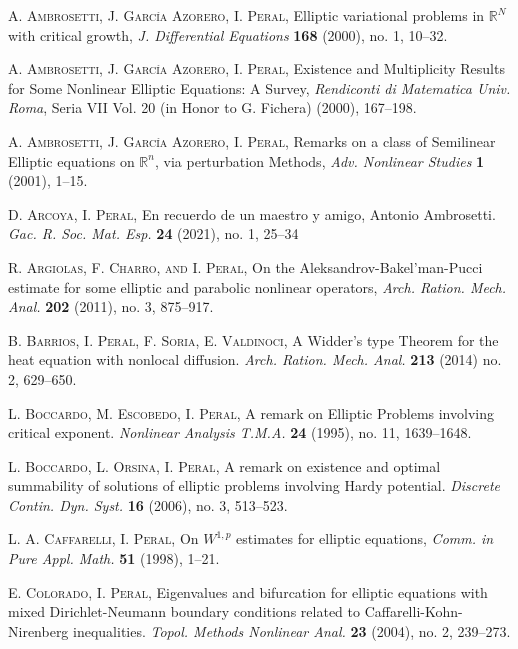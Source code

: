 \begin{thebibliography}{99}
    \textsc{A. Ambrosetti,  J. Garc\'ia Azorero, I. Peral,} Elliptic variational problems in $\mathbb{R}^N$ with critical growth, \textit{J. Differential Equations} \textbf{168}  (2000), no. 1, 10--32. 

    \textsc{A. Ambrosetti,  J. Garc\'ia Azorero, I. Peral,} Existence and Multiplicity Results for Some Nonlinear Elliptic Equations: A Survey, \textit{Rendiconti di Matematica Univ. Roma}, Seria VII Vol. 20 (in Honor to G. Fichera) (2000), 167--198.

    \textsc{A. Ambrosetti,  J. Garc\'ia Azorero, I. Peral,} Remarks on a class of Semilinear Elliptic equations on $\mathbb{R}^n$, via perturbation Methods, \textit{Adv. Nonlinear Studies} \textbf{1} (2001), 1--15.

  \textsc{D. Arcoya, I. Peral,} En recuerdo de un maestro y amigo, Antonio Ambrosetti.  \textit{Gac. R. Soc. Mat. Esp.} \textbf{24} (2021), no. 1, 25--34

    \textsc{R. Argiolas, F. Charro,   and I. Peral}, {On the Aleksandrov-Bakel'man-Pucci estimate for some elliptic and parabolic nonlinear operators}, \textit{Arch. Ration. Mech. Anal.} \textbf{202} (2011), no. 3, 875--917.

    \textsc{B. Barrios, I. Peral, F. Soria, E. Valdinoci},  A Widder's type Theorem for the heat equation with nonlocal diffusion. \textit{Arch. Ration. Mech. Anal.} \textbf{213} (2014) no. 2, 629--650. 
 
    \textsc{L. Boccardo, M. Escobedo, I. Peral},  A remark on Elliptic Problems involving critical exponent. \textit{Nonlinear Analysis T.M.A.} \textbf{24}  (1995), no. 11, 1639--1648.

     \textsc{L. Boccardo, L. Orsina, I. Peral},  A remark on existence and optimal summability of solutions of elliptic problems involving Hardy potential. \textit{Discrete Contin. Dyn. Syst.} \textbf{16} (2006), no. 3, 513--523. 

    \textsc{L. A. Caffarelli, I. Peral,} On $ W^{1,p}$ estimates for elliptic equations, \textit{Comm. in Pure Appl. Math.} \textbf{51} (1998),  1--21.

     \textsc{E. Colorado, I.  Peral, } Eigenvalues and bifurcation for elliptic equations with mixed Dirichlet-Neumann boundary conditions related to Caffarelli-Kohn-Nirenberg inequalities. \textit{Topol. Methods Nonlinear Anal.} \textbf{23} (2004), no. 2, 239--273.


\end{thebibliography}
